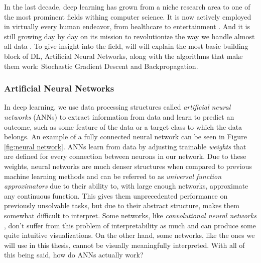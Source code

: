 \documentclass[times, utf8, diplomski, english]{fer_eng}
\begin{document}
In the last decade, deep learning has grown from a niche research area to one of the most prominent fields withing computer science. It is now actively employed in virtually every human endeavor, from healthcare to entertainment \cite{dl_applications}. And it is still growing day by day on its mission to revolutionize the way we handle almost all data \cite{dl_growth}. To give insight into the field, will will explain the most basic building block of DL, Artificial Neural Networks, along with the algorithms that make them work: Stochastic Gradient Descent and Backpropagation.

\subsubsection{Artificial Neural Networks}

In deep learning, we use data processing structures called \textit{artificial neural networks} (ANNs) to extract information from data and learn to predict an outcome, such as some feature of the data or a target class to which the data belongs. An example of a fully connected neural network can be seen in Figure \ref{fig:neural network}. ANNs learn from data by adjusting trainable \textit{weights} that are defined for every connection between neurons in our network. Due to these weights, neural networks are much denser structures when compared to previous machine learning methods and can be referred to as \textit{universal function approximators} \cite{uni_approx} due to their ability to, with large enough networks, approximate any continuous function. This gives them unprecedented performance on previously unsolvable tasks, but due to their abstract structure, makes them somewhat difficult to interpret. Some networks, like \textit{convolutional neural networks} \cite{CNN}, don't suffer from this problem of interpretability as much and can produce some quite intuitive visualizations. On the other hand, some networks, like the ones we will use in this thesis, cannot be visually meaningfully interpreted. With all of this being said, how do ANNs actually work?
\end{document}
